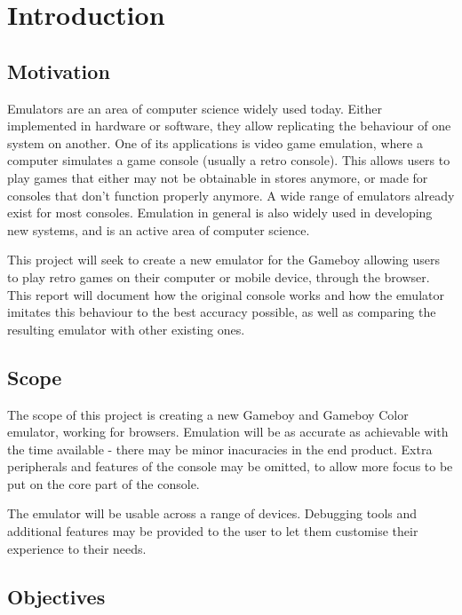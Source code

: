 \documentclass[11pt]{report}
\begin{document}
\clearpage

{\hypersetup{hidelinks}\tableofcontents}

\clearpage

\chapter{Introduction}

\section{Motivation}

Emulators are an area of computer science widely used today. Either implemented in hardware or software, they allow replicating the behaviour of one system on another. One of its applications is video game emulation, where a computer simulates a game console (usually a retro console). This allows users to play games that either may not be obtainable in stores anymore, or made for consoles that don't function properly anymore. A wide range of emulators already exist for most consoles. Emulation in general is also widely used in developing new systems, and is an active area of computer science.

This project will seek to create a new emulator for the Gameboy allowing users to play retro games on their computer or mobile device, through the browser. This report will document how the original console works and how the emulator imitates this behaviour to the best accuracy possible, as well as comparing the resulting emulator with other existing ones.

\section{Scope}

The scope of this project is creating a new Gameboy and Gameboy Color emulator, working for browsers. Emulation will be as accurate as achievable with the time available - there may be minor inacuracies in the end product. Extra peripherals and features of the console may be omitted, to allow more focus to be put on the core part of the console.

The emulator will be usable across a range of devices. Debugging tools and additional features may be provided to the user to let them customise their experience to their needs.

\section{Objectives}
\end{document}
